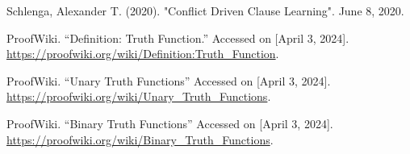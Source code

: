 \begin{thebibliography}{99}

Schlenga, Alexander T. (2020). "Conflict Driven Clause Learning". June 8, 2020.

ProofWiki. ``Definition: Truth Function.'' Accessed on [April 3, 2024]. \url{https://proofwiki.org/wiki/Definition:Truth_Function}.

ProofWiki. ``Unary Truth Functions'' Accessed on [April 3, 2024]. 
\url{https://proofwiki.org/wiki/Unary_Truth_Functions}.

ProofWiki. ``Binary Truth Functions'' Accessed on [April 3, 2024]. 
\url{https://proofwiki.org/wiki/Binary_Truth_Functions}.


\end{thebibliography}
